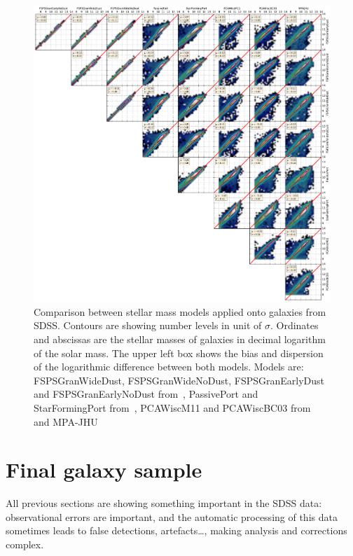 \begin{figure}[htb]
    \centering
    \includegraphics[width=\linewidth]{figures/sdss/stellar_mass_models.pdf}
    \caption{Comparison between stellar mass models applied onto galaxies from
        SDSS\@. Contours are showing number levels in unit of $\sigma$.
        Ordinates and abscissas are the stellar masses of galaxies in decimal
        logarithm of the solar mass. The upper left box shows the bias and
        dispersion of the logarithmic difference between both models. Models
        are: FSPSGranWideDust, FSPSGranWideNoDust, FSPSGranEarlyDust and
        FSPSGranEarlyNoDust from~\cite{Conroy+09}, PassivePort and
        StarFormingPort from~\cite{Maraston+09}, PCAWiscM11 and PCAWiscBC03
    from~\cite{Chen+12} and MPA-JHU~\cite{Brinchmann+04, Kauffmann+03,
Tremonti+04}\label{fig:stellar_mass_models}}
\end{figure}

\section{Final galaxy sample}
\label{sec:final_galaxy_sample}

All previous sections are showing something important in the SDSS data:
observational errors are important, and the automatic processing of this data
sometimes leads to false detections, artefacts\ldots, making analysis and
corrections complex.

